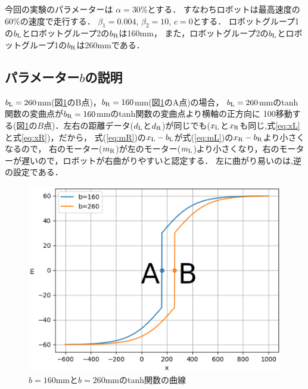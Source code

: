 今回の実験のパラメーターは
$\alpha=30\%$とする．
すなわちロボットは最高速度の60\%の速度で走行する．
$\beta_1=0.004$,
$\beta_2=10$,
$c=0$とする．
ロボットグループ1の$b_{\rm L}$とロボットグループ2の$b_{\rm R}$は160mm，
また，ロボットグループ2の$b_{\rm L}$とロボットグループ1の$b_{\rm R}$は260mmである．

\subsection{パラメーター$b$の説明}
$b_{\rm L}=260$mm(図\ref{fitan}のB点)，$b_{\rm R}=160$mm(図\ref{fitan}のA点)の場合，
$b_{\rm L}=260$mmのtanh関数の変曲点が$b_{\rm R}=160$mmのtanh関数の変曲点より横軸の正方向に
100移動する(図\ref{fitan}の$B$点)．左右の距離データ($d_{\rm L}$と$d_{\rm R}$)が同じでも($x_{\rm L}$と$x_{\rm R}$も同じ,式\ref{eq:xL}と式\ref{eq:xR})，だから，
式(\ref{eq:mR})の$x_{\rm L}-b_{\rm L}$が式(\ref{eq:mL})の$x_{\rm R}-b_{\rm R}$より小さくなるので，
右のモーター($m_{\rm R}$)が左のモーター($m_{\rm L}$)より小さくなり，右のモーターが遅いので，ロボットが右曲がりやすいと認定する．
左に曲がり易いのは,逆の設定である．
\begin{figure}[!ht]
    \centering
    \includegraphics[width=0.7\linewidth]{tanh.eps} 
    \caption{$b=160$mmと$b=260$mmのtanh関数の曲線}
    \label{fitan}
\end{figure}

